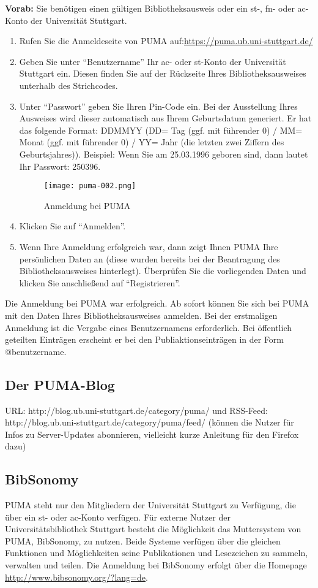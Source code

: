 \documentclass[b5paper,11pt,twoside]{scrbook} %
\begin{document}
\textbf{Vorab:} Sie benötigen einen gültigen Bibliotheksausweis oder ein st-, fn- oder ac-Konto der Universität Stuttgart.
\begin{enumerate}
    \item Rufen Sie die Anmeldeseite von PUMA auf:\newline \url{https://puma.ub.uni-stuttgart.de/}
    \item Geben Sie unter \enquote{Benutzername} Ihr ac- oder st-Konto der Universität Stuttgart ein. Diesen finden Sie auf der Rückseite Ihres Bibliotheksausweises unterhalb des Strichcodes. %
    \item Unter  \enquote{Passwort} geben Sie Ihren Pin-Code ein. Bei der Ausstellung Ihres Ausweises wird dieser automatisch aus Ihrem Geburtsdatum generiert. Er hat das folgende Format: DDMMYY (DD= Tag (ggf. mit führender 0) / MM= Monat (ggf. mit führender 0) / YY= Jahr (die letzten zwei Ziffern des Geburtsjahres)). Beispiel: Wenn Sie am 25.03.1996 geboren sind, dann lautet Ihr Passwort: 250396.
 \begin{figure}[ht]
 \centering
 \texttt{[image: puma-002.png]}
 \caption{Anmeldung bei PUMA}
 \label{figure2}
\end{figure}  
    \item Klicken Sie auf \enquote{Anmelden}.
    \item Wenn Ihre Anmeldung erfolgreich war, dann zeigt Ihnen PUMA Ihre persönlichen Daten an (diese wurden bereits bei der Beantragung des Bibliotheksausweises hinterlegt). Überprüfen Sie die vorliegenden Daten und klicken Sie anschließend auf \enquote{Registrieren}.
\end{enumerate}
Die Anmeldung bei PUMA war erfolgreich. Ab sofort können Sie sich bei PUMA mit den Daten Ihres Bibliotheksausweises anmelden. \newline
Bei der erstmaligen Anmeldung ist die Vergabe eines Benutzernamens erforderlich. Bei öffentlich geteilten Einträgen erscheint er bei den Publiaktionseinträgen in der Form @benutzername.
\subsection{Der PUMA-Blog}


URL: http://blog.ub.uni-stuttgart.de/category/puma/
und RSS-Feed: http://blog.ub.uni-stuttgart.de/category/puma/feed/
(können die Nutzer für Infos zu Server-Updates abonnieren, vielleicht
kurze Anleitung für den Firefox dazu)
\subsection{BibSonomy}
PUMA steht nur den Mitgliedern der Universität Stuttgart zu Verfügung, die über ein st- oder ac-Konto  verfügen. Für externe Nutzer der Universitätsbibliothek Stuttgart besteht die Möglichkeit das Muttersystem von PUMA, BibSonomy, zu nutzen. Beide Systeme verfügen über die gleichen Funktionen und Möglichkeiten seine Publikationen und Lesezeichen zu sammeln, verwalten und teilen. \newline
Die Anmeldung bei BibSonomy erfolgt über die Homepage \url{http://www.bibsonomy.org/?lang=de}. 
\end{document}
